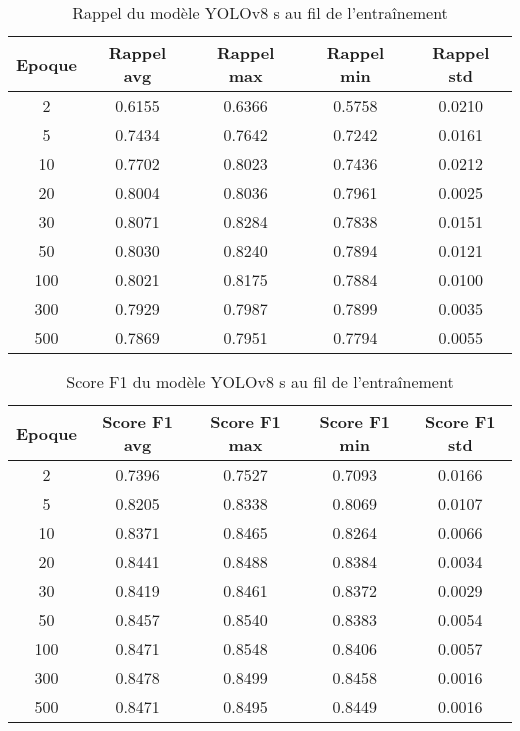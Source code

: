 \begin{table}[!ht]
    \caption{Rappel du modèle YOLOv8 s au fil de l'entraînement}
    \label{tab:yolov8s_rappel}
    \centering
    \begin{tabular}{ |c||c|c|c|c|  }
        \hline
        \rowcolor{gray!50}
        Epoque & Rappel avg & Rappel max & Rappel min & Rappel std\\
        \hline
        2 & 0.6155 & 0.6366 & 0.5758 & 0.0210\\
        5 & 0.7434 & 0.7642 & 0.7242 & 0.0161\\
        10 & 0.7702 & 0.8023 & 0.7436 & 0.0212\\
        20 & 0.8004 & 0.8036 & 0.7961 & 0.0025\\
        30 & 0.8071 & 0.8284 & 0.7838 & 0.0151\\
        50 & 0.8030 & 0.8240 & 0.7894 & 0.0121\\
        100 & 0.8021 & 0.8175 & 0.7884 & 0.0100\\
        300 & 0.7929 & 0.7987 & 0.7899 & 0.0035\\
        500 & 0.7869 & 0.7951 & 0.7794 & 0.0055\\
        \hline
    \end{tabular}
\end{table}

\begin{table}[!ht]
    \caption{Score F1 du modèle YOLOv8 s au fil de l'entraînement}
    \label{tab:yolov8s_f1score}
    \centering
    \begin{tabular}{ |c||c|c|c|c|  }
        \hline
        \rowcolor{gray!50}
        Epoque & Score F1 avg & Score F1 max & Score F1 min & Score F1 std\\
        \hline
        2 & 0.7396 & 0.7527 & 0.7093 & 0.0166\\
        5 & 0.8205 & 0.8338 & 0.8069 & 0.0107\\
        10 & 0.8371 & 0.8465 & 0.8264 & 0.0066\\
        20 & 0.8441 & 0.8488 & 0.8384 & 0.0034\\
        30 & 0.8419 & 0.8461 & 0.8372 & 0.0029\\
        50 & 0.8457 & 0.8540 & 0.8383 & 0.0054\\
        100 & 0.8471 & 0.8548 & 0.8406 & 0.0057\\
        300 & 0.8478 & 0.8499 & 0.8458 & 0.0016\\
        500 & 0.8471 & 0.8495 & 0.8449 & 0.0016\\
        \hline
    \end{tabular}
\end{table}

